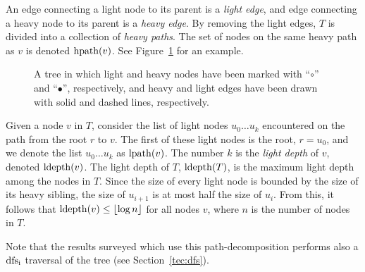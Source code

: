 An edge connecting a light node to its parent is a \emph{light edge}, and edge connecting a heavy node to its parent is a \emph{heavy edge}. By removing the light edges, $T$ is divided into a collection of \emph{heavy paths}. The set of nodes on the same heavy path as $v$ is denoted $\operatorname{hpath}(v)$.  See Figure~\ref{fig:heavylighttree} for an example.
\begin{figure}
\centering
{}
\caption{
A tree in which light and heavy nodes have been marked with ``$\circ$'' and ``$\bullet$'', respectively, and heavy and light edges have been drawn with solid and dashed lines, respectively.} \label{fig:heavylighttree}
\end{figure}

Given a node $v$ in $T$, consider the list of light nodes $u_0 \dots u_k$ encountered on the path from the root $r$ to $v$. The first of these light nodes is the root, $r=u_0$, and we denote the list  $u_0 \dots u_k$ as  $\operatorname{lpath}(v)$. The number $k$ is the \emph{light depth} of $v$, denoted $\operatorname{ldepth}(v)$. The light depth of $T$, $\operatorname{ldepth}(T)$, is the maximum light depth among the nodes in $T$. Since the size of every light node is bounded by the size of its heavy sibling, the size of $u_{i+1}$ is at most half the size of $u_i$. From this, it follows that $\operatorname{ldepth}(v)\leq \left\lfloor{\log n}\right\rfloor$ for all nodes $v$, where $n$ is the number of nodes in $T$. 

Note that the results surveyed which use this path-decomposition performs also a $\operatorname{dfs_i}$ traversal of the tree (see Section~\ref{tec:dfs}).

